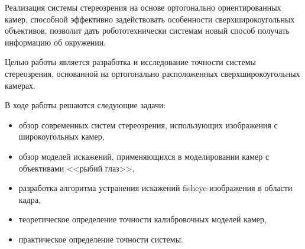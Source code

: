   Реализация системы стереозрения на основе ортогонально ориентированных камер, способной эффективно задействовать особенности 
  сверхширокоугольных объективов, позволит дать робототехнически системам новый способ получать информацию об окружении.

Целью работы является разработка и исследование точности системы стереозрения, основанной на ортогонально расположенных сверхширокоугольных камерах.

В ходе работы решаются следующие задачи:
\begin{itemize}     %
    \item обзор современных систем стереозрения, использующих изображения с широкоугольных камер,
    \item обзор моделей искажений, применяющихся в моделировании камер с объективами <<рыбий глаз>>,
    \item разработка алгоритма устранения искажений fisheye-изображения в  области кадра,                                 
    \item теоретическое определение точности калибровочных моделей камер,
    \item практическое определение точности системы.  
\end{itemize}


\clearpage